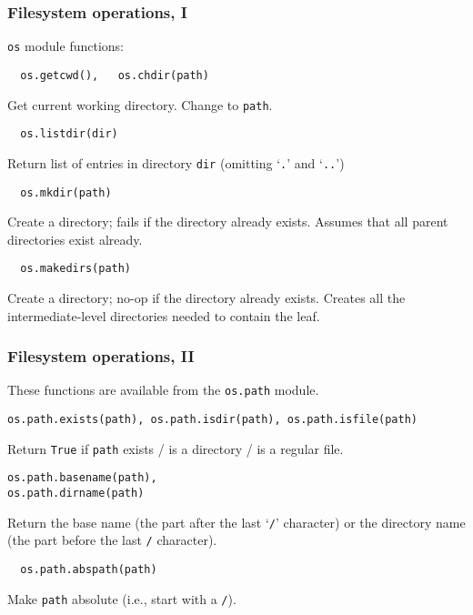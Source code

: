 \begin{frame}[fragile]\frametitle{Filesystem operations, I}
\texttt{os} module functions:

  \begin{lstlisting}
  os.getcwd(),   os.chdir(path)
  \end{lstlisting}
   Get current working directory. Change to \texttt{path}.
  \begin{lstlisting}
  os.listdir(dir)
  \end{lstlisting}
    Return list of entries in directory \texttt{dir} (omitting
    `\texttt{.}' and `\texttt{..}')
  \begin{lstlisting}
  os.mkdir(path)
  \end{lstlisting}
    Create a directory; fails if the directory already exists.
    Assumes that all parent directories exist already.
  \begin{lstlisting}
  os.makedirs(path)
\end{lstlisting}
Create a directory; no-op if the directory already exists.
Creates all the intermediate-level directories needed to contain the leaf.
\end{frame}


\begin{frame}[fragile]\frametitle{Filesystem operations, II}
  These functions are available from the \texttt{os.path} module.

\begin{lstlisting}
os.path.exists(path), os.path.isdir(path), os.path.isfile(path)
\end{lstlisting}
    Return \texttt{True} if \texttt{path} exists / is a directory / is
    a regular file.
  \begin{lstlisting}
os.path.basename(path),
os.path.dirname(path)
  \end{lstlisting}
    Return the base name (the part after the last `\texttt{/}'
    character) or the directory name (the part before the last
    \texttt{/} character).
  \begin{lstlisting}
  os.path.abspath(path)
  \end{lstlisting}
    Make \texttt{path} absolute (i.e., start with a \texttt{/}).
\end{frame}

